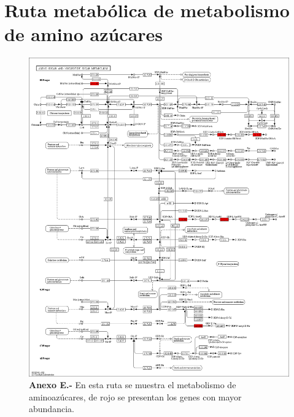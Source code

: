 \documentclass[12pt,letterpaper,oneside]{report}
\begin{document}
\chapter{Ruta metabólica de metabolismo de amino azúcares}
\begin{figure}[!h]
\centering
\includegraphics[scale=0.25]{apendices/E-5}
\caption*{\textbf{Anexo E.-} En esta ruta se muestra el metabolismo de aminoazúcares, de rojo se presentan los genes con mayor abundancia.}
\end{figure}
\end{document}
